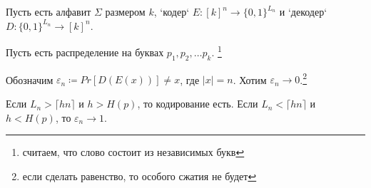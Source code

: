 \section{}
Пусть есть алфавит $ \Sigma$ размером  $ k$, `кодер`  $ E \colon [k]^{n} \to  \{0, 1\}^{L_n}$ и `декодер` $ D\colon \{0, 1\}^{L_n} \to [k]^{n}$.

Пусть есть распределение на буквах $  p_1, p_2, \ldots p_k$. \footnote{считаем, что слово состоит из независимых букв}

Обозначим $ \varepsilon _n \coloneqq Pr [D(E(x))] \ne x$, где $\lvert x  \rvert = n$. Хотим $ \varepsilon _n \to  0$.\footnote{если сделать равенство, то особого сжатия не будет}

\begin{thm}
	Если $ L_n > \lceil h n \rceil $ и  $ h > H(p)$, то кодирование есть. Если  $ L_n < \lceil hn \rceil$ и $ h < H(p)$, то  $ \varepsilon _n \to 1$.
\end{thm}
